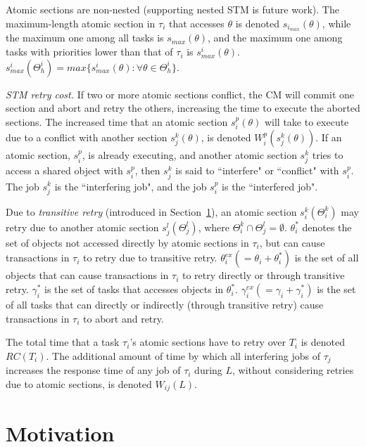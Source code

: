 \documentclass[conference]{IEEEtran}
\begin{document}
Atomic sections are non-nested (supporting nested STM is future work). The maximum-length atomic section in $\tau_i$ that accesses $\theta$ is denoted $s_{i_{max}} (\theta)$, while the maximum one among all tasks is $s_{max} (\theta)$, and the maximum one among tasks with priorities lower than that of $\tau_i$ is $s_{max}^i (\theta)$. $s_{max}^i(\Theta_h^i)=max\{s_{max}^i(\theta):\forall \theta \in \Theta_h^i\}$.

\textit{STM retry cost.} If two or more atomic sections conflict, the CM will commit one section and abort and retry the others, increasing the time to execute the aborted sections. The increased time that an atomic section $s_i^p (\theta)$ will take to execute due to a conflict with another section $s_j^k (\theta)$, is denoted $W_{i}^{p}(s_{j}^{k}(\theta))$. If an atomic section, $s_i^p$, is already executing, and another atomic section $s_j^k$ tries to access a shared object with $s_i^p$, then $s_j^k$ is said to ``interfere" or ``conflict" with $s_i^p$. The job $s_j^k$ is the ``interfering job", and the job $s_i^p$ is the ``interfered job".

Due to \textit{transitive retry} (introduced in Section~\ref{sec:motivation}), an atomic section $s_i^k(\Theta_i^k)$ may retry due to another atomic section $s_j^l(\Theta_j^l)$, where $\Theta_i^k \cap \Theta_j^l = \emptyset$. $\theta_i^*$ denotes the set of objects not accessed directly by atomic sections in $\tau_i$, but can cause transactions in $\tau_i$ to retry due to transitive retry. $\theta_i^{ex}(=\theta_i + \theta_i^*)$ is the set of all objects that can cause transactions in $\tau_i$ to retry directly or through transitive retry. $\gamma_i^*$ is the set of tasks that accesses  objects in $\theta_i^*$. $\gamma_i^{ex}(=\gamma_i + \gamma_i^*)$ is the set of all tasks that can directly or indirectly (through transitive retry) cause transactions in $\tau_i$ to abort and retry.

The total time that a task $\tau_i$'s atomic sections have to retry over $T_i$ is denoted $RC(T_i)$. The additional amount of time by which all interfering jobs of $\tau_j$ increases the response time of any job of $\tau_i$ during $L$, without considering retries due to atomic sections, is denoted $W_{ij}(L)$.

\section{Motivation}
\label{sec:motivation}
\end{document}
